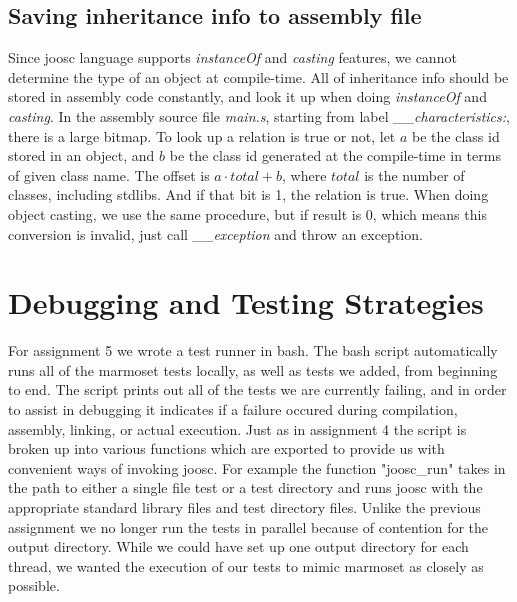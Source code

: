 \documentclass[12pt,letterpaper]{article}
\begin{document}
\subsection{Saving inheritance info to assembly file}
Since joosc language supports \emph{instanceOf} and \emph{casting} features, we cannot determine the type of an object at compile-time.
All of inheritance info should be stored in assembly code constantly, and look it up when doing \emph{instanceOf} and \emph{casting}.
In the assembly source file \emph{main.s}, starting from label \emph{\_\_characteristics:}, there is a large bitmap.
To look up a relation is true or not, let $a$ be the class id stored in an object, and $b$ be the class id generated at the compile-time in terms of given class name.
The offset is $a \cdot total + b$, where $total$ is the number of classes, including stdlibs.
And if that bit is 1, the relation is true.
When doing object casting, we use the same procedure, but if result is 0, which means this conversion is invalid, just call \emph{\_\_exception} and throw an exception.


\section{Debugging and Testing Strategies}
For assignment 5 we wrote a test runner in bash.
The bash script automatically runs all of the marmoset tests locally, as well as tests we added, from beginning to end.
The script prints out all of the tests we are currently failing, and in order to assist in debugging it indicates if a failure occured during compilation, assembly, linking, or actual execution.
Just as in assignment 4 the script is broken up into various functions which are exported to provide us with convenient ways of invoking joosc.
For example the function "joosc\_run" takes in the path to either a single file test or a test directory and runs joosc with the appropriate standard library files and test directory files.
Unlike the previous assignment we no longer run the tests in parallel because of contention for the output directory.
While we could have set up one output directory for each thread, we wanted the execution of our tests to mimic marmoset as closely as possible.
\end{document}
